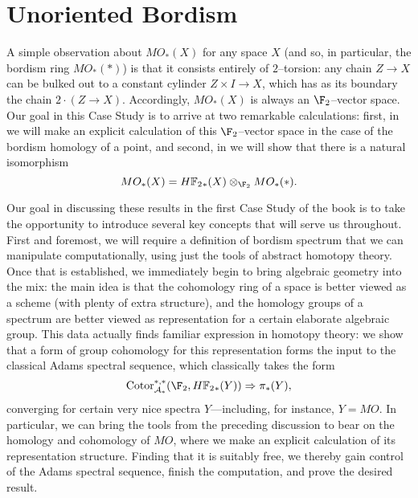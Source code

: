 
\chapter{Unoriented Bordism}\label{UnorientedBordismChapter}




A simple observation about \(MO_*(X)\) for any space \(X\) (and so, in particular, the bordism ring \(MO_*(*)\)) is that it consists entirely of \(2\)--torsion: any chain \(Z \to X\) can be bulked out to a constant cylinder \(Z \times I \to X\), which has as its boundary the chain \(2 \cdot (Z \to X)\).  Accordingly, \(MO_*(X)\) is always an \(\F_2\)--vector space.  Our goal in this Case Study is to arrive at two remarkable calculations: first, in  we will make an explicit calculation of this \(\F_2\)--vector space in the case of the bordism homology of a point, and second, in  we will show that there is a natural isomorphism \[MO_*(X) = \HFtwo_*(X) \otimes_{\F_2} MO_*(*).\]

Our goal in discussing these results in the first Case Study of the book is to take the opportunity to introduce several key concepts that will serve us throughout.  First and foremost, we will require a definition of bordism spectrum that we can manipulate computationally, using just the tools of abstract homotopy theory.  Once that is established, we immediately begin to bring algebraic geometry into the mix: the main idea is that the cohomology ring of a space is better viewed as a scheme (with plenty of extra structure), and the homology groups of a spectrum are better viewed as representation for a certain elaborate algebraic group.  This data actually finds familiar expression in homotopy theory: we show that a form of group cohomology for this representation forms the input to the classical Adams spectral sequence, which classically takes the form \[\Cotor_{\mathcal A_*}^{*, *}(\F_2, \HFtwo_*(Y)) \Rightarrow \pi_*(Y),\] converging for certain very nice spectra \(Y\)---including, for instance, \(Y = MO\).  In particular, we can bring the tools from the preceding discussion to bear on the homology and cohomology of \(MO\), where we make an explicit calculation of its representation structure.  Finding that it is suitably free, we thereby gain control of the Adams spectral sequence, finish the computation, and prove the desired result.

